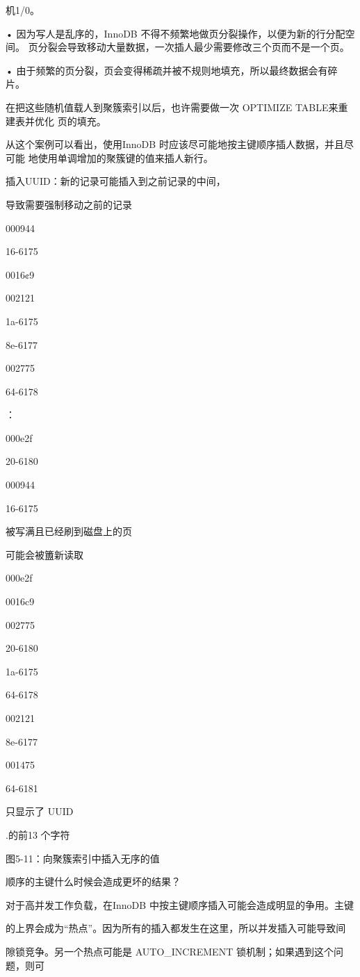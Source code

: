 机1/0。

• 因为写人是乱序的，InnoDB 不得不频繁地做页分裂操作，以便为新的行分配空间。
页分裂会导致移动大量数据，一次插人最少需要修改三个页而不是一个页。

• 由于频繁的页分裂，页会变得稀疏并被不规则地填充，所以最终数据会有碎片。

在把这些随机值载人到聚簇索引以后，也许需要做一次 OPTIMIZE TABLE来重建表并优化
页的填充。

从这个案例可以看出，使用InnoDB 时应该尽可能地按主键顺序插人数据，并且尽可能
地使用单调增加的聚簇键的值来插人新行。

插入UUID：新的记录可能插入到之前记录的中间，

导致需要强制移动之前的记录

000944

16-6175

0016¢9

002121

1a-6175

8e-6177

002775

64-6178

：

000e2f

20-6180

000944

16-6175

被写满且已经刷到磁盘上的页

可能会被簠新读取

000e2f

0016c9

002775

20-6180

1a-6175

64-6178

002121

8e-6177

001475

64-6181

只显示了 UUID

.的前13 个字符

图5-11：向聚簇索引中插入无序的值

顺序的主键什么时候会造成更坏的结果？

对于高并发工作负载，在InnoDB 中按主键顺序插入可能会造成明显的争用。主键

的上界会成为“热点”。因为所有的插入都发生在这里，所以并发插入可能导致间

隙锁竞争。另一个热点可能是 AUTO\_INCREMENT 锁机制；如果遇到这个问题，则可

